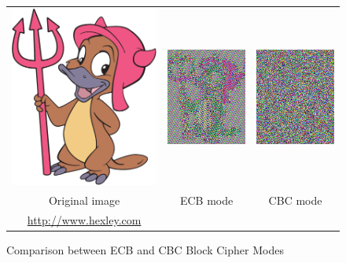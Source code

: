 \documentclass[portrait, a0]{a0poster}
\begin{document}
\begin{textblock}{8}
\begin{figure}
\centering
\footnotesize
\begin{tabular}{c c c}
\\
\includegraphics[width=6cm]{pics/hex.pdf} & \includegraphics{pics/ecb.png} & \includegraphics{pics/cbc.png} \\
Original image & ECB mode & CBC mode \\
{\scriptsize \url{http://www.hexley.com}}
\end{tabular}
\caption{Comparison between ECB and CBC Block Cipher Modes \label{fig:ecb}}
\end{figure}

\end{textblock}
\end{document}
